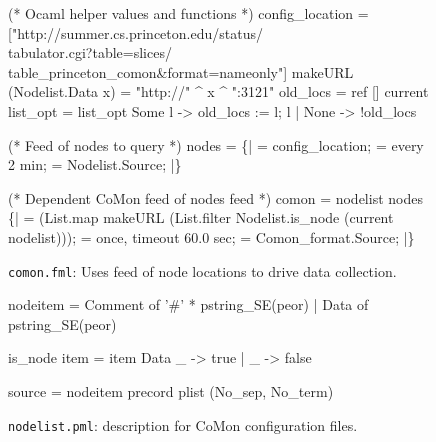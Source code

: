 \begin{figure}[t]
\begin{code}
(* Ocaml helper values and functions *)
 config_location = 
 ["http://summer.cs.princeton.edu/status/ \\
   tabulator.cgi?table=slices/ \\
   table_princeton_comon&format=nameonly"]
 makeURL (Nodelist.Data x) = 
     "http://" ^ x ^ ":3121"
 old_locs = ref []
 current list_opt =
   list_opt 
    Some l ->  old_locs := l; l
  | None   -> !old_locs

(* Feed of nodes to query *)
 nodes =  
   \{|
      =  config_location;
     = every 2 min;
       = Nodelist.Source;
  |\}

(* Dependent CoMon feed of nodes feed *)
 comon =
   nodelist  nodes 
     \{|
        =  
          (List.map makeURL 
          (List.filter Nodelist.is_node 
          (current nodelist)));
       = once, timeout 60.0 sec; 
         = Comon_format.Source;
    |\}
\end{code}
\shrink
\caption{\texttt{comon.fml}: Uses feed of node locations to drive
  data collection.} \shrink
\label{fig:feedcomon}
\end{figure}

\begin{figure}[t]
\begin{code}
 nodeitem =
  Comment of '#' * pstring_SE(peor)
| Data of pstring_SE(peor)

 is_node item = 
   item 
  Data _ -> true
  | _ -> false

 source = 
  nodeitem precord plist (No_sep, No_term)
\end{code}
\shrink
\shrink
\caption{\texttt{nodelist.pml}: \padsml{} description for CoMon configuration 
  files.}\shrink
\label{fig:nodepml}
\end{figure}


